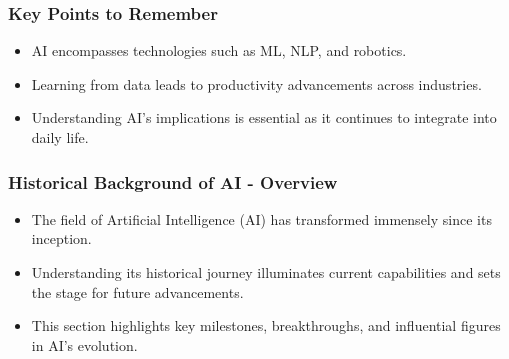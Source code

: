 \documentclass{beamer}
\begin{document}
\begin{frame}[fragile]
    \frametitle{Key Points to Remember}
    \begin{itemize}
        \item AI encompasses technologies such as ML, NLP, and robotics.
        \item Learning from data leads to productivity advancements across industries.
        \item Understanding AI's implications is essential as it continues to integrate into daily life.
    \end{itemize}
\end{frame}

\begin{frame}[fragile]
    \frametitle{Historical Background of AI - Overview}
    \begin{itemize}
        \item The field of Artificial Intelligence (AI) has transformed immensely since its inception.
        \item Understanding its historical journey illuminates current capabilities and sets the stage for future advancements.
        \item This section highlights key milestones, breakthroughs, and influential figures in AI's evolution.
    \end{itemize}
\end{frame}
\end{document}
